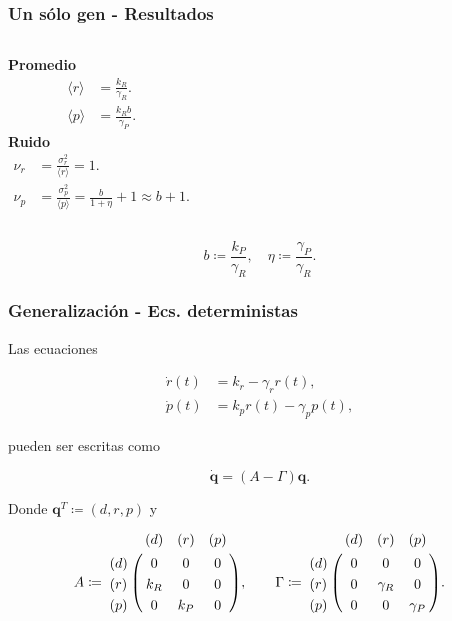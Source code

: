 \documentclass{beamer}
\begin{document}
\begin{frame}
\frametitle{Un s\'olo gen - Resultados}

\begin{columns}[c]
\centering \textbf{Promedio}
\begin{align*}
\langle r \rangle &= \frac{k_R}{\gamma_R}.\\[1.5ex]
\langle p \rangle &= \frac{k_Rb}{\gamma_P}.
\end{align*}
\centering \textbf{Ruido}
\begin{align*}
\nu_r &= \frac{\sigma_r^2}{\langle r \rangle} = 1.\\[1.5ex]
\nu_p &= \frac{\sigma_p^2}{\langle p \rangle} = \frac{b}{1+\eta} + 1 \approx b + 1.
\end{align*}
\end{columns}

\vspace{3 mm}

\begin{equation*}
b \coloneqq \frac{k_P}{\gamma_R}, \quad \eta \coloneqq \frac{\gamma_P}{\gamma_R}.
\end{equation*}

\end{frame}


\begin{frame}
\frametitle{Generalizaci\'on - Ecs. deterministas}

Las ecuaciones

\begin{align*}
\dot{r}(t) &= k_r - \gamma_rr(t),\\
\dot{p}(t) &= k_pr(t) - \gamma_pp(t),
\end{align*}

pueden ser escritas como

\begin{equation*}
\mathbf{\dot{q}} = (A - \Gamma)\mathbf{q}.
\end{equation*}

Donde $\mathbf{q}^T \coloneqq (d, r, p)$ y

\begin{align*}
A \coloneqq \bordermatrix{
  ~ & (d) & (r) & (p) \cr
  (d) & 0 & 0 & 0 \cr
  (r) & k_R & 0 & 0 \cr
  (p) & 0 & k_P & 0 \cr}, \quad \quad
\Gamma \coloneqq \bordermatrix{
  ~ & (d) & (r) & (p) \cr
  (d) & 0 & 0 & 0 \cr
  (r) & 0 & \gamma_R & 0 \cr
  (p) & 0 & 0 & \gamma_P \cr}.\\
\end{align*}
\end{frame}
\end{document}
